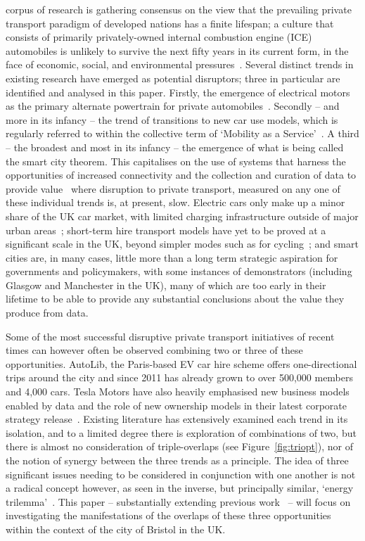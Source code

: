 \documentclass[journal]{IEEEtran}
\begin{document}
 corpus of research is gathering consensus on
the view that the prevailing private transport paradigm of developed
nations has a finite lifespan; a culture that consists of primarily
privately-owned internal combustion engine (ICE) automobiles is
unlikely to survive the next fifty years in its current form, in the
face of economic, social, and environmental
pressures~\cite{lerner:2011,van-audenhove-et-al:2014,black-et-al:2016}.
Several distinct trends in existing research have emerged as potential
disruptors; three in particular are identified and analysed in this
paper. Firstly, the emergence of electrical motors as the
primary alternate powertrain for private
automobiles~\cite{paffumi-et-al:2015,gnann-et-al:2015}.  Secondly --
and more in its infancy -- the trend of transitions to new car use
models, which is regularly referred to within the collective term of
`Mobility as a Service'~\cite{tscatapult:2016}. A third -- the
broadest and most in its infancy -- the emergence of what is being
called the smart city theorem. This capitalises on the use of systems
that harness the opportunities of increased connectivity and the
collection and curation of data to provide
value~\cite{townsend:2013,cosgrave-et-al:2013,ibm:2014} where
disruption to private transport, measured on any one of these
individual trends is, at present, slow. Electric cars only make up a
minor share of the UK car market, with limited charging infrastructure
outside of major urban areas~\cite{dft:2008}; short-term hire
transport models have yet to be proved at a significant scale in the
UK, beyond simpler modes such as for
cycling~\cite{kamargianni-et-al:2016}; and smart cities are, in many
cases, little more than a long term strategic aspiration for
governments and policymakers, with some instances of demonstrators
(including Glasgow and Manchester in the UK), many of which are too
early in their lifetime to be able to provide any substantial
conclusions about the value they produce from data.

Some of the most successful disruptive private transport initiatives
of recent times can however often be observed combining two or three
of these opportunities. AutoLib, the Paris-based EV car hire scheme
offers one-directional trips around the city and since 2011 has
already grown to over 500,000 members and 4,000 cars. Tesla Motors
have also heavily emphasised new business models enabled by data and
the role of new ownership models in their latest corporate strategy
release~\cite{musk:2016}. Existing literature has extensively examined
each trend in its isolation, and to a limited degree there is
exploration of combinations of two, but there is almost no
consideration of triple-overlaps (see Figure~\ref{fig:triopt}), nor of
the notion of synergy between the three trends as a principle. The
idea of three significant issues needing to be considered in
conjunction with one another is not a radical concept however, as seen
in the inverse, but principally similar, `energy
trilemma'~\cite{wec:2015}. This paper -- substantially extending
previous work~\cite{cooper-et-al-sose:2015} -- will focus on
investigating the manifestations of the overlaps of these three
opportunities within the context of the city of Bristol in the UK.
\end{document}
